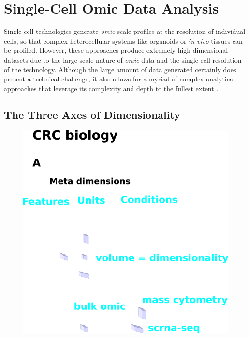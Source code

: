 \section{Single-Cell Omic Data Analysis}

Single-cell technologies generate \emph{omic} scale profiles at the resolution of individual cells, so that complex heterocellular systems like organoids or \textit{in vivo} tissues can be profiled.
However, these approaches produce extremely high dimensional datasets due to the large-scale nature of \emph{omic} data and the single-cell resolution of the technology. Although the large amount of data generated certainly does present a technical challenge, it also allows for a myriad of complex analytical approaches that leverage its complexity and depth to the fullest extent \cite{mincarelli_defining_2018,qin_deciphering_2020}. 

\subsection{The Three Axes of Dimensionality}

\begin{figure}
    \centering
    \includegraphics{01intro/figs/1COMP_dims.png}
    \caption{}
    \label{fig:fig5}
\end{figure}


